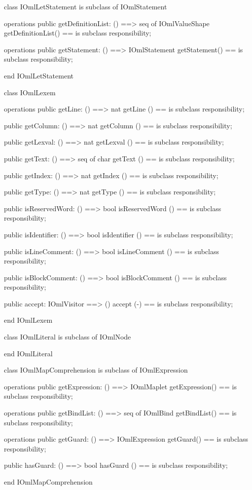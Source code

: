 \begin{vdm_al}
class IOmlLetStatement
 is subclass of IOmlStatement

operations
  public getDefinitionList: () ==> seq of IOmlValueShape
  getDefinitionList() == is subclass responsibility;

operations
  public getStatement: () ==> IOmlStatement
  getStatement() == is subclass responsibility;

end IOmlLetStatement
\end{vdm_al}

\begin{vdm_al}
class IOmlLexem

operations
  public getLine: () ==> nat
  getLine () == is subclass responsibility;

  public getColumn: () ==> nat
  getColumn () == is subclass responsibility;

  public getLexval: () ==> nat
  getLexval () == is subclass responsibility;

  public getText: () ==> seq of char
  getText () == is subclass responsibility;

  public getIndex: () ==> nat
  getIndex () == is subclass responsibility;

  public getType: () ==> nat
  getType () == is subclass responsibility;

  public isReservedWord: () ==> bool
  isReservedWord () == is subclass responsibility;

  public isIdentifier: () ==> bool
  isIdentifier () == is subclass responsibility;

  public isLineComment: () ==> bool
  isLineComment () == is subclass responsibility;

  public isBlockComment: () ==> bool
  isBlockComment () == is subclass responsibility;

  public accept: IOmlVisitor ==> ()
  accept (-) == is subclass responsibility;

end IOmlLexem
\end{vdm_al}
\begin{vdm_al}
class IOmlLiteral
 is subclass of IOmlNode

end IOmlLiteral
\end{vdm_al}

\begin{vdm_al}
class IOmlMapComprehension
 is subclass of IOmlExpression

operations
  public getExpression: () ==> IOmlMaplet
  getExpression() == is subclass responsibility;

operations
  public getBindList: () ==> seq of IOmlBind
  getBindList() == is subclass responsibility;

operations
  public getGuard: () ==> IOmlExpression
  getGuard() == is subclass responsibility;

  public hasGuard: () ==> bool
  hasGuard () == is subclass responsibility;

end IOmlMapComprehension
\end{vdm_al}


